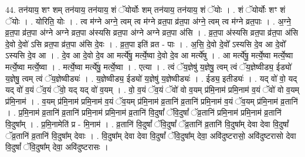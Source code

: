 \documentclass[17pt]{extarticle}
\begin{document}
44. तन॑याय॒ शꣳ शम् तन॑याय॒ तन॑याय॒ शं ॅयोर्योः शम् तन॑याय॒ तन॑याय॒ शं ॅयोः । . शं ॅयोर्योः शꣳ शं ॅयोः । . योरिति॒ योः । . त्व म॑ग्ने अग्ने॒ त्वम् त्व म॑ग्ने व्रत॒पा व्र॑त॒पा अ॑ग्ने॒ त्वम् त्व म॑ग्ने व्रत॒पाः । . अ॒ग्ने॒ व्र॒त॒पा व्र॑त॒पा अ॑ग्ने अग्ने व्रत॒पा अ॑स्यसि व्रत॒पा अ॑ग्ने अग्ने व्रत॒पा अ॑सि । . व्र॒त॒पा अ॑स्यसि व्रत॒पा व्र॑त॒पा अ॑सि दे॒वो दे॒वो॑ ऽसि व्रत॒पा व्र॑त॒पा अ॑सि दे॒वः । . व्र॒त॒पा इति॑ व्रत - पाः । . अ॒सि॒ दे॒वो दे॒वो᳚ ऽस्यसि दे॒व आ दे॒वो᳚ ऽस्यसि दे॒व आ । . दे॒व आ दे॒वो दे॒व आ मर्त्ये॑षु॒ मर्त्ये॒ष्वा दे॒वो दे॒व आ मर्त्ये॑षु । . आ मर्त्ये॑षु॒ मर्त्ये॒ष्वा मर्त्ये॒ष्वा मर्त्ये॒ष्वा मर्त्ये॒ष्वा । . मर्त्ये॒ष्वा मर्त्ये॑षु॒ मर्त्ये॒ष्वा । . एत्या । . त्वं ॅय॒ज्ञेषु॑ य॒ज्ञेषु॒ त्वम् त्वं ॅय॒ज्ञेष्वीड्य॒ ईड्यो॑ य॒ज्ञेषु॒ त्वम् त्वं ॅय॒ज्ञेष्वीड्यः॑ । . य॒ज्ञेष्वीड्य॒ ईड्यो॑ य॒ज्ञेषु॑ य॒ज्ञेष्वीड्यः॑ । . ईड्य॒ इतीड्यः॑ । . यद् वो॑ वो॒ यद् यद् वो॑ व॒यं ॅव॒यं ॅवो॒ यद् यद् वो॑ व॒यम् । . वो॒ व॒यं ॅव॒यं ॅवो॑ वो व॒यम् प्र॑मि॒नाम॑ प्रमि॒नाम॑ व॒यं ॅवो॑ वो व॒यम् प्र॑मि॒नाम॑ । . व॒यम् प्र॑मि॒नाम॑ प्रमि॒नाम॑ व॒यं ॅव॒यम् प्र॑मि॒नाम॑ व्र॒तानि॑ व्र॒तानि॑ प्रमि॒नाम॑ व॒यं ॅव॒यम् प्र॑मि॒नाम॑ व्र॒तानि॑ । . प्र॒मि॒नाम॑ व्र॒तानि॑ व्र॒तानि॑ प्रमि॒नाम॑ प्रमि॒नाम॑ व्र॒तानि॑ वि॒दुषां᳚ ॅवि॒दुषां᳚ ॅव्र॒तानि॑ प्रमि॒नाम॑ प्रमि॒नाम॑ व्र॒तानि॑ वि॒दुषा᳚म् । . प्र॒मि॒नामेति॑ प्र - मि॒नाम॑ । . व्र॒तानि॑ वि॒दुषां᳚ ॅवि॒दुषां᳚ ॅव्र॒तानि॑ व्र॒तानि॑ वि॒दुषा᳚म् देवा देवा वि॒दुषां᳚ ॅव्र॒तानि॑ व्र॒तानि॑ वि॒दुषा᳚म् देवाः । . वि॒दुषा᳚म् देवा देवा वि॒दुषां᳚ ॅवि॒दुषा᳚म् देवा॒ अवि॑दुष्टरासो॒ अवि॑दुष्टरासो देवा वि॒दुषां᳚ ॅवि॒दुषा᳚म् देवा॒ अवि॑दुष्टरासः । \newline
\end{document}
